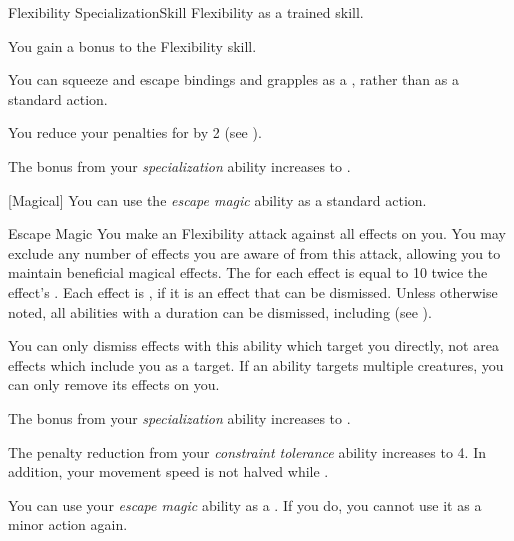     \begin{feat}{Flexibility Specialization}{Skill}
        \featpre Flexibility as a trained skill.

         You gain a  bonus to the Flexibility skill.

         You can squeeze and escape bindings and grapples as a , rather than as a standard action.

         You reduce your penalties for \squeezing by 2 (see ).

         The bonus from your \textit{specialization} ability increases to .

        [Magical] You can use the \textit{escape magic} ability as a standard action.
        \begin{freeability}{Escape Magic}
            You make an Flexibility attack against all  effects on you.
            You may exclude any number of effects you are aware of from this attack, allowing you to maintain beneficial magical effects.
            The  for each effect is equal to 10 \add twice the effect's .
            \hit Each effect is , if it is an effect that can be dismissed.
            Unless otherwise noted, all  abilities with a duration can be dismissed, including  (see ).
        \end{freeability}

        You can only dismiss effects with this ability which target you directly, not area effects which include you as a target.
        If an ability targets multiple creatures, you can only remove its effects on you.

         The bonus from your \textit{specialization} ability increases to .

         The penalty reduction from your \textit{constraint tolerance} ability increases to 4.
        In addition, your movement speed is not halved while \squeezing.

         You can use your \textit{escape magic} ability as a .
        If you do, you  cannot use it as a minor action again.
    \end{feat}

